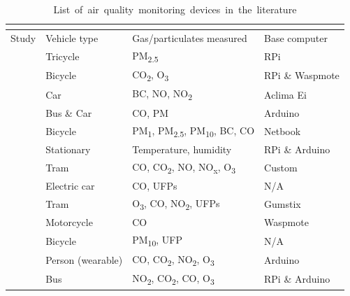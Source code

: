 \documentclass[11pt,twosided,a4paper]{report}
\begin{document}

\begin{landscape}
  \small
\begin{longtable}{ p{} p{} p{} p{} }
  \caption{\mbox{List of air quality monitoring devices in the literature}}
  \vspace{-0.4cm}
  \label{listofprevdevices} \\
  \toprule
  Study & Vehicle type & Gas/particulates measured & Base computer \\ \midrule
  \cite{Jabbar2017bikefossarchitecture} & Tricycle & PM\textsubscript{2.5} & RPi \\ \midrule
  \cite{Alvear2016ecosensor} & Bicycle & CO\textsubscript{2}, O\textsubscript{3} & RPi \& Waspmote\\ \midrule
  \cite{Apte2017googlestreetview} & Car & BC, NO, NO\textsubscript{2} & Aclima Ei \\ \midrule
  \cite{Devarakonda2013} & Bus \& Car & CO, PM & Arduino \\ \midrule
  \cite{Elen2013aeroflex} & Bicycle & PM\textsubscript{1}, PM\textsubscript{2.5}, PM\textsubscript{10}, BC, CO & Netbook \\ \midrule
  \cite{Ferdoush2014rasppiandarduino} & Stationary & Temperature, humidity & RPi \& Arduino \\ \midrule
  \cite{Hagemann2014aerotram} & Tram & CO, CO\textsubscript{2}, NO, NO\textsubscript{x}, O\textsubscript{3}  & Custom \\ \midrule
  \cite{Hagler2010durhamallelectric} & Electric car & CO, UFPs & N/A \\ \midrule
  \cite{Hasenfratz2015highresmapsTram} & Tram & O\textsubscript{3}, CO, NO\textsubscript{2}, UFPs & Gumstix \\ \midrule
  \cite{Hoang2013hanoihexagons} & Motorcycle & CO & Waspmote \\ \midrule
  \cite{Peters2013cycleruns} & Bicycle & PM\textsubscript{10}, UFP & N/A \\ \midrule
  \cite{Piedrahita2014quantexposuremtrng} & Person (wearable) & CO, CO\textsubscript{2}, NO\textsubscript{2}, O\textsubscript{3} & Arduino \\ \midrule
  \cite{2014busairqualityVSN} & Bus & NO\textsubscript{2}, CO\textsubscript{2}, CO, O\textsubscript{3} & RPi \& Arduino \\ \midrule

\end{longtable}
\end{landscape}
\end{document}
